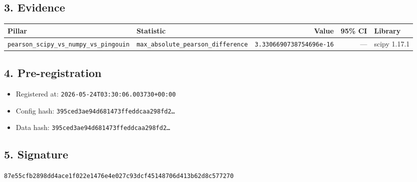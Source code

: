 \documentclass{article}
\begin{document}
\subsection*{3. Evidence}
\begin{tabular}{llrrl}\toprule
\textbf{Pillar} & \textbf{Statistic} & \textbf{Value} & \textbf{95\% CI} & \textbf{Library} \\\midrule
\texttt{pearson\_scipy\_vs\_numpy\_vs\_pingouin} & \texttt{max\_absolute\_pearson\_difference} & \texttt{3.3306690738754696e-16} & --- & scipy 1.17.1 \\
\bottomrule\end{tabular}
\subsection*{4. Pre-registration}
\begin{itemize}
\item Registered at: \texttt{2026-05-24T03:30:06.003730+00:00}
\item Config hash: \texttt{395ced3ae94d681473ffeddcaa298fd2\dots}
\item Data hash: \texttt{395ced3ae94d681473ffeddcaa298fd2\dots}
\end{itemize}
\subsection*{5. Signature}
\texttt{87e55cfb2898dd4ace1f022e1476e4e027c93dcf45148706d413b62d8c577270}\\
\end{document}
